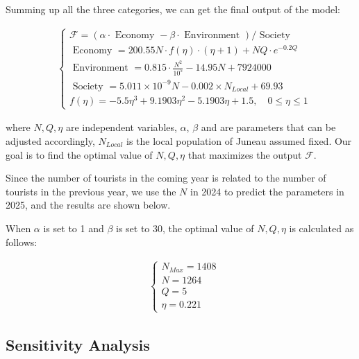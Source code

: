 Summing up all the three categories, we can get the final output of the model:

\begin{equation}
    \begin{aligned}
    &\left\{\begin{array}{l}
    \mathcal{F}=(\alpha \cdot \text { Economy }-\beta \cdot \text { Environment }) / \text { Society } \\[10pt]
    \text { Economy }=200.55 N \cdot f(\eta) \cdot (\eta+1)+NQ\cdot e^{-0.2 Q} \\[10pt]
    \text { Environment }=0.815 \cdot \frac{N^2}{10^5}-14.95 N+7924000 \\[10pt]
    \text { Society }=5.011\times 10^{-9} N -0.002 \times N_{Local}+69.93 \\[10pt]
    f(\eta)=-5.5 \eta^3+9.1903 \eta^2-5.1903 \eta+1.5, \quad 0 \leq \eta \leq 1
    \end{array}\right.
    \end{aligned}
\end{equation}

where $N,Q,\eta$ are independent variables, $\alpha$, $\beta$ 
and are parameters that can be adjusted accordingly, 
$N_{Local}$ is the local population of Juneau assumed fixed.
Our goal is to find the optimal value of $N,Q,\eta$ that maximizes the output $\mathcal{F}$.

Since the number of tourists in the coming year is related to the number of tourists in the previous year, 
we use the $N$ in 2024 to predict the parameters in 2025, and the results are shown below.

When $\alpha$ is set to 1 and $\beta$ is set to 30, 
the optimal value of $N,Q,\eta$ is calculated as follows:

\begin{equation}
    \begin{aligned}
    &\left\{\begin{array}{l}
    N_{Max} = 1408 \\[10pt]
    N=1264 \\[10pt]
    Q=5 \\[10pt]
    \eta=0.221
    \end{array}\right.
    \end{aligned}
\end{equation}

\subsection{Sensitivity Analysis}

